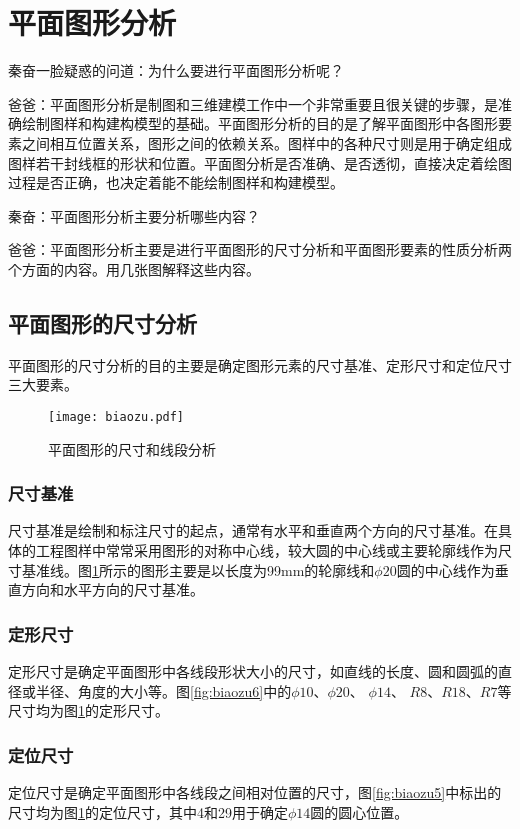 \section{平面图形分析}
秦奋一脸疑惑的问道：为什么要进行平面图形分析呢？

爸爸：平面图形分析是制图和三维建模工作中一个非常重要且很关键的步骤，是准确绘制图样和构建构模型的基础。平面图形分析的目的是了解平面图形中各图形要素之间相互位置关系，图形之间的依赖关系。图样中的各种尺寸则是用于确定组成图样若干封线框的形状和位置。平面图分析是否准确、是否透彻，直接决定着绘图过程是否正确，也决定着能不能绘制图样和构建模型。

秦奋：平面图形分析主要分析哪些内容？

爸爸：平面图形分析主要是进行平面图形的尺寸分析和平面图形要素的性质分析两个方面的内容。用几张图解释这些内容。

\subsection{平面图形的尺寸分析}
平面图形的尺寸分析的目的主要是确定图形元素的尺寸基准、定形尺寸和定位尺寸三大要素。

\begin{figure}[htbp]
\centering
\texttt{[image: biaozu.pdf]}
\caption{平面图形的尺寸和线段分析} \label{fig:biaozu}
\end{figure}

\subsubsection{尺寸基准} 

尺寸基准是绘制和标注尺寸的起点，通常有水平和垂直两个方向的尺寸基准。在具体的工程图样中常常采用图形的对称中心线，较大圆的中心线或主要轮廓线作为尺寸基准线。图\ref{fig:biaozu}所示的图形主要是以长度为99mm的轮廓线和$\phi 20$圆的中心线作为垂直方向和水平方向的尺寸基准。

\subsubsection{定形尺寸} 

定形尺寸是确定平面图形中各线段形状大小的尺寸，如直线的长度、圆和圆弧的直径或半径、角度的大小等。图\ref{fig:biaozu6}中的$\phi 10$、$\phi 20$、 $\phi 14$、 $R8$、$R18$、$R7$等尺寸均为图\ref{fig:biaozu}的定形尺寸。

\begin{figure}[htbp]
\centering
\begin{floatrow}
\end{floatrow}
\end{figure}

\subsubsection{定位尺寸} 

定位尺寸是确定平面图形中各线段之间相对位置的尺寸，图\ref{fig:biaozu5}中标出的尺寸均为图\ref{fig:biaozu}的定位尺寸，其中4和29用于确定$\phi 14$圆的圆心位置。
\endinput
